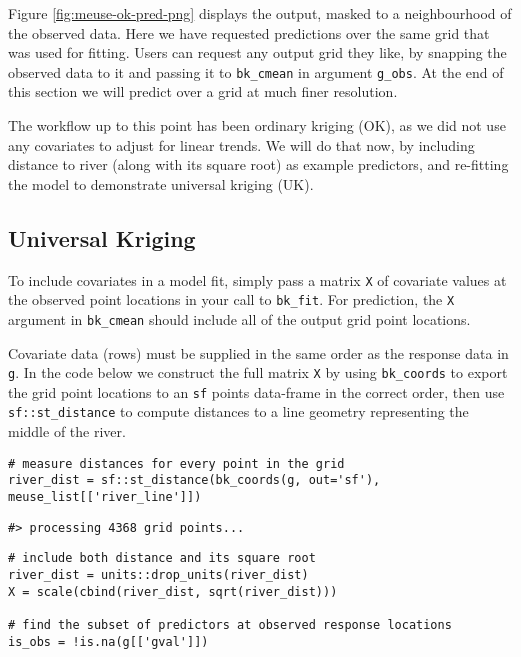 Figure \ref{fig:meuse-ok-pred-png} displays the output, masked to a neighbourhood of the observed data. Here we have requested predictions over the same grid that was used for fitting. Users can request any output grid they like, by snapping the observed data to it and passing it to \texttt{bk\_cmean} in argument \texttt{g\_obs}. At the end of this section we will predict over a grid at much finer resolution.

The workflow up to this point has been ordinary kriging (OK), as we did not use any covariates to adjust for linear trends. We will do that now, by including distance to river (along with its square root) as example predictors, and re-fitting the model to demonstrate universal kriging (UK).

\hypertarget{universal-kriging}{%
\subsection{Universal Kriging}\label{universal-kriging}}

To include covariates in a model fit, simply pass a matrix \texttt{X} of covariate values at the observed point locations in your call to \texttt{bk\_fit}. For prediction, the \texttt{X} argument in \texttt{bk\_cmean} should include all of the output grid point locations.

Covariate data (rows) must be supplied in the same order as the response data in \texttt{g}. In the code below we construct the full matrix \texttt{X} by using \texttt{bk\_coords} to export the grid point locations to an \texttt{sf} points data-frame in the correct order, then use \texttt{sf::st\_distance} to compute distances to a line geometry representing the middle of the river.

\begin{verbatim}
# measure distances for every point in the grid
river_dist = sf::st_distance(bk_coords(g, out='sf'), meuse_list[['river_line']])
\end{verbatim}

\begin{verbatim}
#> processing 4368 grid points...
\end{verbatim}

\begin{verbatim}
# include both distance and its square root
river_dist = units::drop_units(river_dist)
X = scale(cbind(river_dist, sqrt(river_dist)))

# find the subset of predictors at observed response locations
is_obs = !is.na(g[['gval']])
\end{verbatim}

